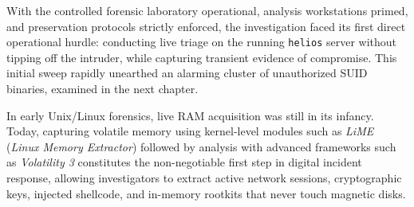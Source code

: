 With the controlled forensic laboratory operational, analysis workstations primed, and preservation protocols strictly enforced, the investigation faced its first direct operational hurdle: conducting live triage on the running \texttt{helios} server without tipping off the intruder, while capturing transient evidence of compromise. This initial sweep rapidly unearthed an alarming cluster of unauthorized SUID binaries, examined in the next chapter.

\begin{perspectiva20}
In early Unix/Linux forensics, live RAM acquisition was still in its infancy. Today, capturing volatile memory using kernel-level modules such as \textit{LiME} (\textit{Linux Memory Extractor}) followed by analysis with advanced frameworks such as \textit{Volatility 3} constitutes the non-negotiable first step in digital incident response, allowing investigators to extract active network sessions, cryptographic keys, injected shellcode, and in-memory rootkits that never touch magnetic disks.
\end{perspectiva20}
